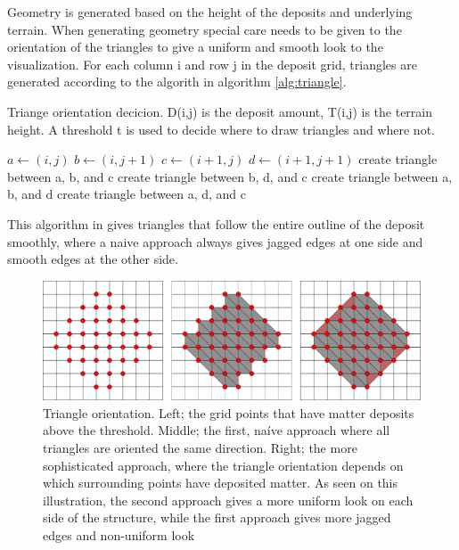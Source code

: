 \documentclass[a4paper,12pt]{article}
\newcommand{\And}{\textbf{ and }}
\begin{document}
Geometry is generated based on the height of the deposits and underlying terrain. When generating geometry special care needs to be given to the orientation of the triangles to give a uniform and smooth look to the visualization. For each column i and row j in the deposit grid, triangles are generated according to the algorith in algorithm \ref{alg:triangle}. 

\begin{algorithm}

 \caption{Triange orientation decicion. D(i,j) is the deposit amount, T(i,j) is the terrain height. A threshold t is used to decide where to draw triangles and where not.}
 \label{alg:triangle}
 \begin{algorithmic}
 
  \State $a \gets (i,j)$
  \State $b \gets (i,j+1)$
  \State $c \gets (i+1,j)$
  \State $d \gets (i+1, j+1)$
  \If {$D(c) > t \And D(b) > t$}
	\State create triangle between a, b, and c
     \EndIf
	\State create triangle between b, d, and c
     \EndIf
  \ElsIf {$D(a) > t \And D(d) > t$}
	\State create triangle between a, b, and d
     \EndIf
	\State create triangle between a, d, and c
     \EndIf
  \EndIf
  \EndFor
  
  \EndFor
  
 \end{algorithmic}

\end{algorithm}


  
This algorithm in gives triangles that follow the entire outline of the deposit smoothly, where a naive approach always gives jagged edges at one side and smooth edges at the other side.

\begin{figure}
 \includegraphics[width=\linewidth]{thesis/gridtrianglesall.pdf}
 \caption{Triangle orientation. Left; the grid points that have matter deposits above the threshold. Middle; the first, naíve approach where all triangles are oriented the same direction. Right; the more sophisticated approach, where the triangle orientation depends on which surrounding points have deposited matter. As seen on this illustration, the second approach gives a more uniform look on each side of the structure, while the first approach gives more jagged edges and non-uniform look}
\end{figure}
\end{document}
